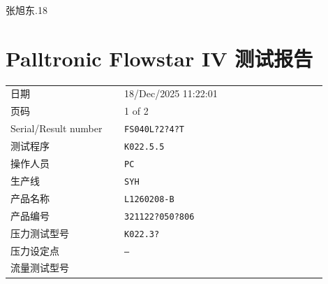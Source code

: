 \documentclass[UTF8,10pt,a4paper,fontset=fandol]{ctexart}
\newcommand{\fieldvalue}[1]{#1}
\newcommand{\handwritten}[1]{#1}
\begin{document}
\noindent\hfill\handwritten{张旭东.18}\hfill\strut



\newpage

\section*{Palltronic Flowstar IV 测试报告}

\begin{tabular}{@{}p{0.32\linewidth}p{0.58\linewidth}@{}}
日期 &
\fieldvalue{18/Dec/2025 11:22:01} \\
页码 &
\fieldvalue{1 of 2} \\
Serial/Result number &
\fieldvalue{\texttt{FS040L?2?4?T}} \\
测试程序 &
\fieldvalue{\texttt{K022.5.5}} \\
操作人员 &
\fieldvalue{\texttt{PC}} \\
生产线 &
\fieldvalue{\texttt{SYH}} \\
产品名称 &
\fieldvalue{\texttt{L1260208-B}} \\
产品编号 &
\fieldvalue{\texttt{321122?050?806}} \\
压力测试型号 &
\fieldvalue{\texttt{K022.3?}} \\
压力设定点 &
\fieldvalue{\texttt{--}} \\
流量测试型号 &

\end{tabular}
\end{document}
